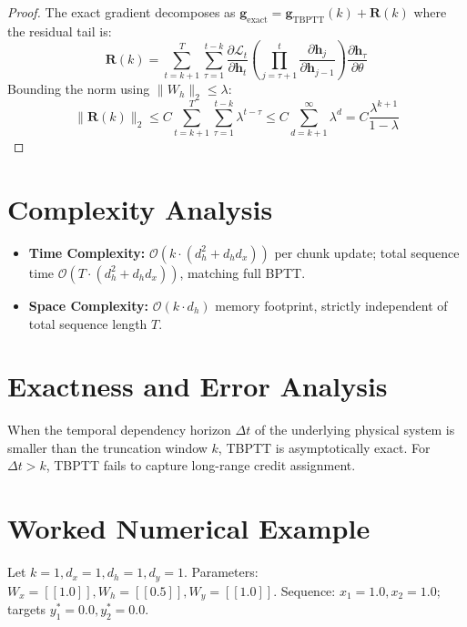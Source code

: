 \documentclass[11pt,a4paper]{article}
\theoremstyle{definition}
\begin{document}
\begin{proof}
The exact gradient decomposes as $\mathbf{g}_{\text{exact}} = \mathbf{g}_{\text{TBPTT}}(k) + \mathbf{R}(k)$ where the residual tail is:
\begin{equation}
\mathbf{R}(k) = \sum_{t=k+1}^T \sum_{\tau=1}^{t-k} \frac{\partial \mathcal{L}_t}{\partial \mathbf{h}_t} \left( \prod_{j=\tau+1}^t \frac{\partial \mathbf{h}_j}{\partial \mathbf{h}_{j-1}} \right) \frac{\partial \mathbf{h}_\tau}{\partial \theta}
\end{equation}
Bounding the norm using $\|W_h\|_2 \le \lambda$:
\begin{equation}
\|\mathbf{R}(k)\|_2 \le C \sum_{t=k+1}^T \sum_{\tau=1}^{t-k} \lambda^{t-\tau} \le C \sum_{d=k+1}^\infty \lambda^d = C \frac{\lambda^{k+1}}{1 - \lambda}
\end{equation}
\end{proof}

\section{Complexity Analysis}

\begin{itemize}
    \item \textbf{Time Complexity:} $\mathcal{O}(k \cdot (d_h^2 + d_h d_x))$ per chunk update; total sequence time $\mathcal{O}(T \cdot (d_h^2 + d_h d_x))$, matching full BPTT.
    \item \textbf{Space Complexity:} $\mathcal{O}(k \cdot d_h)$ memory footprint, strictly independent of total sequence length $T$.
\end{itemize}

\section{Exactness and Error Analysis}

When the temporal dependency horizon $\Delta t$ of the underlying physical system is smaller than the truncation window $k$, TBPTT is asymptotically exact. For $\Delta t > k$, TBPTT fails to capture long-range credit assignment.

\section{Worked Numerical Example}

Let $k=1, d_x=1, d_h=1, d_y=1$. Parameters: $W_x = [[1.0]], W_h = [[0.5]], W_y = [[1.0]]$.
Sequence: $x_1 = 1.0, x_2 = 1.0$; targets $y_1^* = 0.0, y_2^* = 0.0$.
\end{document}

